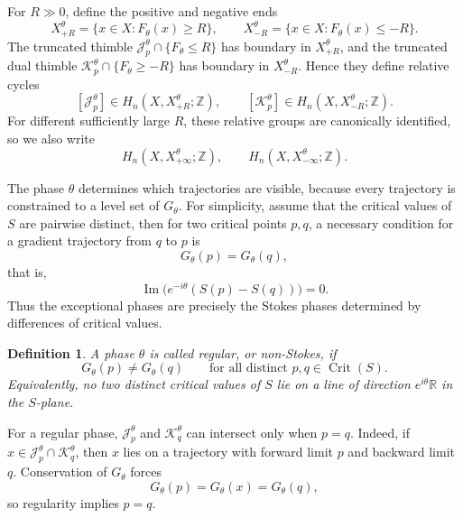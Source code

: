 \documentclass[11pt]{amsart}
\theoremstyle{plain}
\newtheorem{defn}[thm]{Definition}
\newcommand{\R}{\mathbb R}
\newcommand{\Z}{\mathbb Z}
\newcommand{\im}{\operatorname{Im}}
\newcommand{\Crit}{\operatorname{Crit}}
\newcommand{\J}{\mathcal J}
\newcommand{\Kk}{\mathcal K}
\begin{document}
For $R\gg 0$, define the positive and negative ends
\begin{equation*}\label{eq:relative-ends}
X_{+R}^\theta=\{x\in X:F_{\theta}(x)\ge R\},
\qquad
X_{-R}^\theta=\{x\in X:F_{\theta}(x)\le -R\}.
\end{equation*}
The truncated thimble $\J_p^\theta\cap\{F_{\theta}\le R\}$ has boundary in $X_{+R}^\theta$, and the truncated dual thimble $\Kk_p^\theta\cap\{F_{\theta}\ge -R\}$ has boundary in $X_{-R}^\theta$.  Hence they define relative cycles
\begin{equation*}\label{eq:relative-classes}
[\J_p^\theta]\in H_n(X,X_{+R}^\theta;\Z),
\qquad
[\Kk_p^\theta]\in H_n(X,X_{-R}^\theta;\Z).
\end{equation*}
For different sufficiently large $R$, these relative groups are canonically identified, so we also write
\begin{equation*}\label{eq:infinity-relative-groups}
H_n(X,X_{+\infty}^\theta;\Z),
\qquad
H_n(X,X_{-\infty}^\theta;\Z).
\end{equation*}


The phase $\theta$ determines which trajectories are visible, because every trajectory is constrained to a level set of $G_{\theta}$.  For simplicity, assume that the critical values of \(S\) are pairwise distinct, then for two critical points $p,q$, a necessary condition for a gradient trajectory from $q$ to $p$ is
\begin{equation*}\label{eq:necessary-stokes-condition}
G_{\theta}(p)=G_{\theta}(q),
\end{equation*}
that is,
\begin{equation*}\label{eq:stokes-wall-condition}
\im\bigl(e^{-i\theta}(S(p)-S(q))\bigr)=0.
\end{equation*}
Thus the exceptional phases are precisely the Stokes phases determined by differences of critical values.


\begin{defn}\label{def:regular-phase}  
A phase $\theta$ is called regular, or non-Stokes, if
\begin{equation*}\label{eq:regular-phase}
G_{\theta}(p)\ne G_{\theta}(q)
\qquad\text{for all distinct }p,q\in\Crit(S).
\end{equation*}
Equivalently, no two distinct critical values of $S$ lie on a line of direction $e^{i\theta}\R$ in the $S$-plane.
\end{defn}


For a regular phase, $\J_p^\theta$ and $\Kk_q^\theta$ can intersect only when $p=q$.  Indeed, if $x\in \J_p^\theta\cap\Kk_q^\theta$, then $x$ lies on a trajectory with forward limit $p$ and backward limit $q$.  Conservation of $G_{\theta}$ forces
\[
G_{\theta}(p)=G_{\theta}(x)=G_{\theta}(q),
\]
so regularity implies $p=q$.
\end{document}
